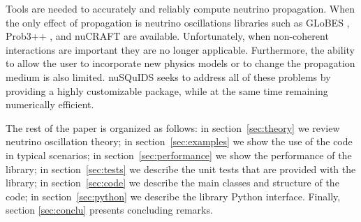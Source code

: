 \documentclass[3p,12pt]{elsarticle}
\newcommand{\ttf}{\ttfamily}
\begin{document}
Tools are needed to accurately and reliably compute neutrino
propagation.
When the only effect of propagation is neutrino oscillations libraries such as {\ttf GLoBES}
\citep{Huber:2007ji}, {\ttf Prob3++} \citep{prob3pp, Calland:2013vaa},
and {\ttf nuCRAFT} \citep{Wallraff:2014vl} are
available. Unfortunately, when non-coherent interactions are 
important they are no longer applicable. Furthermore, the ability to
allow the user to incorporate new physics models or to change the
propagation medium is also limited. {\ttf nuSQuIDS} seeks to
address all of these problems by providing a highly customizable
package, while at the same time remaining numerically efficient.

The rest of the paper is organized as follows: in section~\ref{sec:theory}
we review neutrino oscillation theory; in section~\ref{sec:examples}
we show the use of the code in typical
scenarios; in section~\ref{sec:performance} we show the performance of
the library; in section~\ref{sec:tests} we describe the unit tests that
are provided with the library; in section~\ref{sec:code} we describe
the main classes and structure of the code; in section~\ref{sec:python}
we describe the library {\ttf Python} interface. Finally, section
\ref{sec:conclu} presents concluding remarks.
\end{document}

